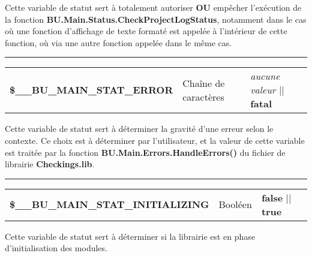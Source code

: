 \documentclass[a4paper,10pt]{article}
\begin{document}
    \begin{justify}
        Cette variable de statut sert à totalement autoriser \textbf{OU} empêcher l'exécution de la fonction \textbf{\color{func}BU.Main.Status.CheckProjectLogStatus}, notamment dans le cas où une fonction d'affichage de texte formaté est appelée à l'intérieur de cette fonction, où via une autre fonction appelée dans le même cas.
    \end{justify}


    \par\noindent\rule{\textwidth}{0.4pt}

    \begin{justify}
        \begin{tabular}{l|l|l}
                    \textbf{\color{vars}\$\_\_BU\_MAIN\_STAT\_ERROR}  & Chaîne de caractères    & \textit{aucune valeur} || \textbf{fatal}\\[1\baselineskip]
        \end{tabular}
    \end{justify}

    \begin{justify}
        Cette variable de statut sert à déterminer la gravité d'une erreur selon le contexte. Ce choix est à déterminer par l'utilisateur, et la valeur de cette variable est traitée par la fonction \textbf{\color{func}BU.Main.Errors.HandleErrors()} du fichier de librairie \textbf{\color{path}Checkings.lib}.
    \end{justify}


    \par\noindent\rule{\textwidth}{0.4pt}

    \begin{justify}
        \begin{tabular}{l|l|l}
            \textbf{\color{vars}\$\_\_BU\_MAIN\_STAT\_INITIALIZING}       & Booléen  & \textbf{false} || \textbf{true}\\[1\baselineskip]
        \end{tabular}
    \end{justify}

    \begin{justify}
        Cette variable de statut sert à déterminer si la librairie est en phase d'initialisation des modules.
    \end{justify}

\end{document}
